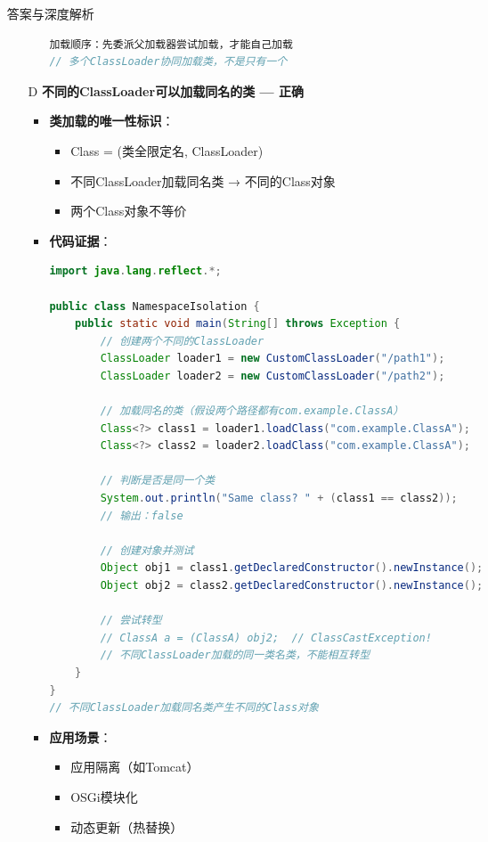 \documentclass[12pt, a4paper]{ctexart}
\begin{document}
\begin{enumerate}[label=\textbf{\arabic*.}]
\begin{bluebox}{答案与深度解析}
\begin{itemize}[leftmargin=*, nosep, label={}]
\begin{itemize}[label={}, leftmargin=*, nosep]
\begin{lstlisting}[language=Java]
加载顺序：先委派父加载器尝试加载，才能自己加载
// 多个ClassLoader协同加载类，不是只有一个
					      \end{lstlisting}
			            \end{itemize}

			      \item[D] \textbf{不同的ClassLoader可以加载同名的类 — 正确}
			            \begin{itemize}[label={}, leftmargin=*, nosep]
				            \item \textbf{类加载的唯一性标识}：
				                  \begin{itemize}[label={}, nosep]
					                  \item Class = (类全限定名, ClassLoader)
					                  \item 不同ClassLoader加载同名类 → 不同的Class对象
					                  \item 两个Class对象不等价
				                  \end{itemize}
				            \item \textbf{代码证据}：
				                  \begin{lstlisting}[language=Java]
import java.lang.reflect.*;

public class NamespaceIsolation {
    public static void main(String[] throws Exception {
        // 创建两个不同的ClassLoader
        ClassLoader loader1 = new CustomClassLoader("/path1");
        ClassLoader loader2 = new CustomClassLoader("/path2");

        // 加载同名的类（假设两个路径都有com.example.ClassA）
        Class<?> class1 = loader1.loadClass("com.example.ClassA");
        Class<?> class2 = loader2.loadClass("com.example.ClassA");

        // 判断是否是同一个类
        System.out.println("Same class? " + (class1 == class2));
        // 输出：false

        // 创建对象并测试
        Object obj1 = class1.getDeclaredConstructor().newInstance();
        Object obj2 = class2.getDeclaredConstructor().newInstance();

        // 尝试转型
        // ClassA a = (ClassA) obj2;  // ClassCastException!
        // 不同ClassLoader加载的同一类名类，不能相互转型
    }
}
// 不同ClassLoader加载同名类产生不同的Class对象
				      \end{lstlisting}
				            \item \textbf{应用场景}：
				                  \begin{itemize}[label={}, nosep]
					                  \item 应用隔离（如Tomcat）
					                  \item OSGi模块化
					                  \item 动态更新（热替换）
				                  \end{itemize}
			            \end{itemize}
		      \end{itemize}


\end{bluebox}
\end{enumerate}
\end{document}
